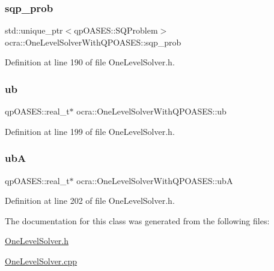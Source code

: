 \subsubsection{\texorpdfstring{sqp\+\_\+prob}{sqp\_prob}}
{\footnotesize\ttfamily std\+::unique\+\_\+ptr$<$qp\+O\+A\+S\+E\+S\+::\+S\+Q\+Problem$>$ ocra\+::\+One\+Level\+Solver\+With\+Q\+P\+O\+A\+S\+E\+S\+::sqp\+\_\+prob\hspace{0.3cm}{\ttfamily [protected]}}



Definition at line 190 of file One\+Level\+Solver.\+h.

\hypertarget{classocra_1_1OneLevelSolverWithQPOASES_a53854c9775b3ff65f4a0621bab17613c}{}\label{classocra_1_1OneLevelSolverWithQPOASES_a53854c9775b3ff65f4a0621bab17613c} 
\subsubsection{\texorpdfstring{ub}{ub}}
{\footnotesize\ttfamily qp\+O\+A\+S\+E\+S\+::real\+\_\+t$\ast$ ocra\+::\+One\+Level\+Solver\+With\+Q\+P\+O\+A\+S\+E\+S\+::ub\hspace{0.3cm}{\ttfamily [protected]}}



Definition at line 199 of file One\+Level\+Solver.\+h.

\hypertarget{classocra_1_1OneLevelSolverWithQPOASES_a2cb624cfce8e1940c5107251418ee7dd}{}\label{classocra_1_1OneLevelSolverWithQPOASES_a2cb624cfce8e1940c5107251418ee7dd} 
\subsubsection{\texorpdfstring{ubA}{ubA}}
{\footnotesize\ttfamily qp\+O\+A\+S\+E\+S\+::real\+\_\+t$\ast$ ocra\+::\+One\+Level\+Solver\+With\+Q\+P\+O\+A\+S\+E\+S\+::ubA\hspace{0.3cm}{\ttfamily [protected]}}



Definition at line 202 of file One\+Level\+Solver.\+h.



The documentation for this class was generated from the following files\+:\begin{DoxyCompactItemize}
\item 
\hyperlink{OneLevelSolver_8h}{One\+Level\+Solver.\+h}\item 
\hyperlink{OneLevelSolver_8cpp}{One\+Level\+Solver.\+cpp}\end{DoxyCompactItemize}
